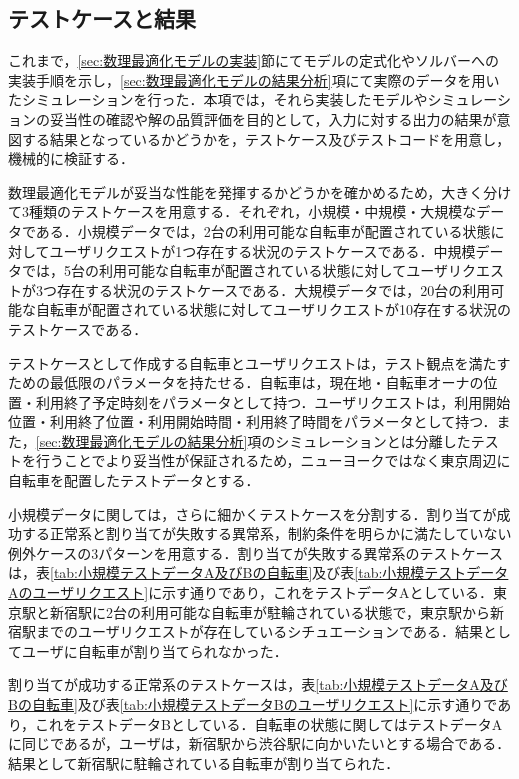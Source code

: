       \subsection{テストケースと結果}
        \label{sec:テストケースと結果}
          \par これまで，\ref{sec:数理最適化モデルの実装}節にてモデルの定式化やソルバーへの実装手順を示し，\ref{sec:数理最適化モデルの結果分析}項にて実際のデータを用いたシミュレーションを行った．本項では，それら実装したモデルやシミュレーションの妥当性の確認や解の品質評価を目的として，入力に対する出力の結果が意図する結果となっているかどうかを，テストケース及びテストコードを用意し，機械的に検証する．
          \par 数理最適化モデルが妥当な性能を発揮するかどうかを確かめるため，大きく分けて3種類のテストケースを用意する．それぞれ，小規模・中規模・大規模なデータである．小規模データでは，2台の利用可能な自転車が配置されている状態に対してユーザリクエストが1つ存在する状況のテストケースである．中規模データでは，5台の利用可能な自転車が配置されている状態に対してユーザリクエストが3つ存在する状況のテストケースである．大規模データでは，20台の利用可能な自転車が配置されている状態に対してユーザリクエストが10存在する状況のテストケースである．
          \par テストケースとして作成する自転車とユーザリクエストは，テスト観点を満たすための最低限のパラメータを持たせる．自転車は，現在地・自転車オーナの位置・利用終了予定時刻をパラメータとして持つ．ユーザリクエストは，利用開始位置・利用終了位置・利用開始時間・利用終了時間をパラメータとして持つ．また，\ref{sec:数理最適化モデルの結果分析}項のシミュレーションとは分離したテストを行うことでより妥当性が保証されるため，ニューヨークではなく東京周辺に自転車を配置したテストデータとする．
          \par 小規模データに関しては，さらに細かくテストケースを分割する．割り当てが成功する正常系と割り当てが失敗する異常系，制約条件を明らかに満たしていない例外ケースの3パターンを用意する．割り当てが失敗する異常系のテストケースは，表\ref{tab:小規模テストデータA及びBの自転車}及び表\ref{tab:小規模テストデータAのユーザリクエスト}に示す通りであり，これをテストデータAとしている．東京駅と新宿駅に2台の利用可能な自転車が駐輪されている状態で，東京駅から新宿駅までのユーザリクエストが存在しているシチュエーションである．結果としてユーザに自転車が割り当てられなかった．
          \par 割り当てが成功する正常系のテストケースは，表\ref{tab:小規模テストデータA及びBの自転車}及び表\ref{tab:小規模テストデータBのユーザリクエスト}に示す通りであり，これをテストデータBとしている．自転車の状態に関してはテストデータAに同じであるが，ユーザは，新宿駅から渋谷駅に向かいたいとする場合である．結果として新宿駅に駐輪されている自転車が割り当てられた．
